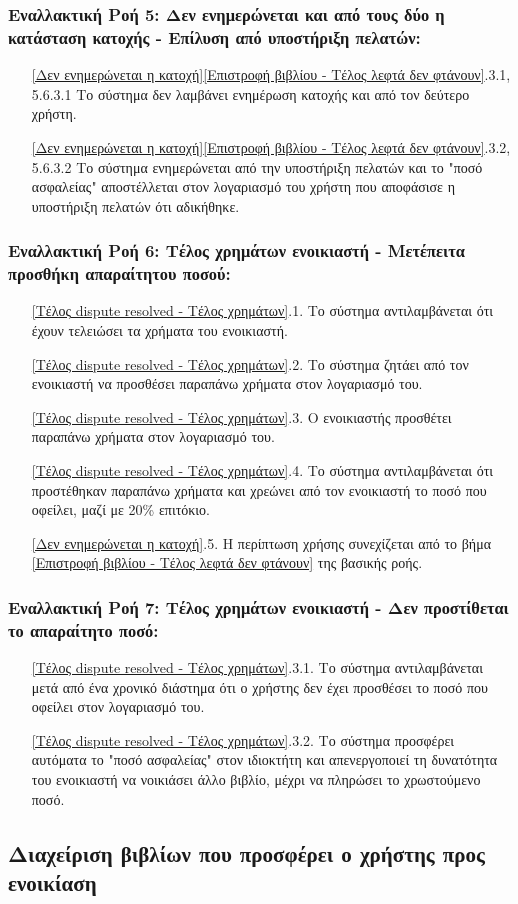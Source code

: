 \documentclass[12pt,a4paper]{article}
\begin{document}
\subsubsection*{Εναλλακτική Ροή 5: Δεν ενημερώνεται και από τους δύο η κατάσταση κατοχής - Επίλυση από υποστήριξη πελατών:}
\begin{enumerate}
    \item[\ref{Δεν ενημερώνεται η κατοχή}\|\ref{Επιστροφή βιβλίου - Τέλος λεφτά δεν φτάνουν}.3.1, 5.6.3.1] Το σύστημα δεν λαμβάνει ενημέρωση κατοχής και από τον δεύτερο χρήστη.
    \item[\ref{Δεν ενημερώνεται η κατοχή}\|\ref{Επιστροφή βιβλίου - Τέλος λεφτά δεν φτάνουν}.3.2, 5.6.3.2]Το σύστημα ενημερώνεται από την υποστήριξη πελατών και το "ποσό ασφαλείας" αποστέλλεται στον λογαριασμό του χρήστη που αποφάσισε η υποστήριξη πελατών ότι αδικήθηκε.
\end{enumerate}

\subsubsection*{Εναλλακτική Ροή 6: Τέλος χρημάτων ενοικιαστή - Μετέπειτα προσθήκη απαραίτητου ποσού:}
\begin{enumerate}
    \item[\ref{Τέλος dispute resolved - Τέλος χρημάτων}.1.] Το σύστημα αντιλαμβάνεται ότι έχουν τελειώσει τα χρήματα του ενοικιαστή.
    \item[\ref{Τέλος dispute resolved - Τέλος χρημάτων}.2.] Το σύστημα ζητάει από τον ενοικιαστή να προσθέσει παραπάνω χρήματα στον λογαριασμό του.
    \item[\ref{Τέλος dispute resolved - Τέλος χρημάτων}.3.] Ο ενοικιαστής προσθέτει παραπάνω χρήματα στον λογαριασμό του.
    \item[\ref{Τέλος dispute resolved - Τέλος χρημάτων}.4.] Το σύστημα αντιλαμβάνεται ότι προστέθηκαν παραπάνω χρήματα και χρεώνει από τον ενοικιαστή το ποσό που οφείλει, μαζί με 20\% επιτόκιο.
    \item[\ref{Δεν ενημερώνεται η κατοχή}.5.] Η περίπτωση χρήσης συνεχίζεται από το βήμα \ref{Επιστροφή βιβλίου - Τέλος λεφτά δεν φτάνουν} της βασικής ροής.
\end{enumerate}

\subsubsection*{Εναλλακτική Ροή 7: Τέλος χρημάτων ενοικιαστή - Δεν προστίθεται το απαραίτητο ποσό:}
\begin{enumerate}
    \item[\ref{Τέλος dispute resolved - Τέλος χρημάτων}.3.1.] Το σύστημα αντιλαμβάνεται μετά από ένα χρονικό διάστημα ότι ο χρήστης δεν έχει προσθέσει το ποσό που οφείλει στον λογαριασμό του.
    \item[\ref{Τέλος dispute resolved - Τέλος χρημάτων}.3.2.] Το σύστημα προσφέρει αυτόματα το "ποσό ασφαλείας" στον ιδιοκτήτη και απενεργοποιεί τη δυνατότητα του ενοικιαστή να νοικιάσει άλλο βιβλίο, μέχρι να πληρώσει το χρωστούμενο ποσό.
\end{enumerate}

\subsection{Διαχείριση βιβλίων που προσφέρει ο χρήστης προς ενοικίαση}
\end{document}
